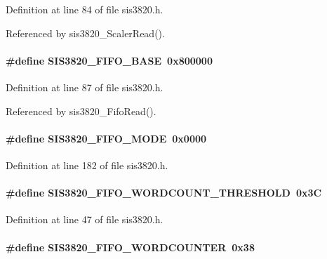 Definition at line 84 of file sis3820.h.

Referenced by sis3820\_\-ScalerRead().
\paragraph[{SIS3820\_\-FIFO\_\-BASE}]{\setlength{\rightskip}{0pt plus 5cm}\#define SIS3820\_\-FIFO\_\-BASE~0x800000}\hfill\label{sis3820_8h_aafb345101b6453f32b926b197d77eb9e}


Definition at line 87 of file sis3820.h.

Referenced by sis3820\_\-FifoRead().
\paragraph[{SIS3820\_\-FIFO\_\-MODE}]{\setlength{\rightskip}{0pt plus 5cm}\#define SIS3820\_\-FIFO\_\-MODE~0x0000}\hfill\label{sis3820_8h_a233044fc3a1e7425eab090a03670033a}


Definition at line 182 of file sis3820.h.
\paragraph[{SIS3820\_\-FIFO\_\-WORDCOUNT\_\-THRESHOLD}]{\setlength{\rightskip}{0pt plus 5cm}\#define SIS3820\_\-FIFO\_\-WORDCOUNT\_\-THRESHOLD~0x3C}\hfill\label{sis3820_8h_a7492ce39893800115d6531ed530eda3d}


Definition at line 47 of file sis3820.h.
\paragraph[{SIS3820\_\-FIFO\_\-WORDCOUNTER}]{\setlength{\rightskip}{0pt plus 5cm}\#define SIS3820\_\-FIFO\_\-WORDCOUNTER~0x38}\hfill\label{sis3820_8h_a6cf1bcffbdd928c4ea34f7b86761278b}


